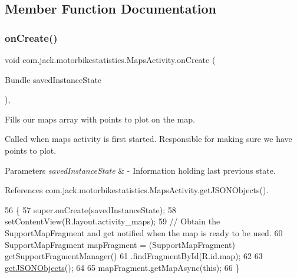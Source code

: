 \subsection{Member Function Documentation}
\mbox{\label{classcom_1_1jack_1_1motorbikestatistics_1_1_maps_activity_afd23eb0cf651de276a9b85bb5fa609b8}} 
\subsubsection{\texorpdfstring{on\+Create()}{onCreate()}}
{\footnotesize\ttfamily void com.\+jack.\+motorbikestatistics.\+Maps\+Activity.\+on\+Create (\begin{DoxyParamCaption}\item[{Bundle}]{saved\+Instance\+State }\end{DoxyParamCaption})\hspace{0.3cm}{\ttfamily [inline]}, {\ttfamily [protected]}}



Fills our maps array with points to plot on the map. 

Called when maps activity is first started. Responsible for making sure we have points to plot.


\begin{DoxyParams}{Parameters}
{\em saved\+Instance\+State} & -\/ Information holding last previous state. \\
\hline
\end{DoxyParams}


References com.\+jack.\+motorbikestatistics.\+Maps\+Activity.\+get\+J\+S\+O\+N\+Objects().


\begin{DoxyCode}
56                                                        \{
57         super.onCreate(savedInstanceState);
58         setContentView(R.layout.activity\_maps);
59         \textcolor{comment}{// Obtain the SupportMapFragment and get notified when the map is ready to be used.}
60         SupportMapFragment mapFragment = (SupportMapFragment) getSupportFragmentManager()
61                 .findFragmentById(R.id.map);
62 
63         \hyperlink{classcom_1_1jack_1_1motorbikestatistics_1_1_maps_activity_a0c72fcb79424420c3477add9ba6ab447}{getJSONObjects}();
64 
65         mapFragment.getMapAsync(\textcolor{keyword}{this});
66     \}
\end{DoxyCode}
\mbox{\label{classcom_1_1jack_1_1motorbikestatistics_1_1_maps_activity_a0c72fcb79424420c3477add9ba6ab447}} 
